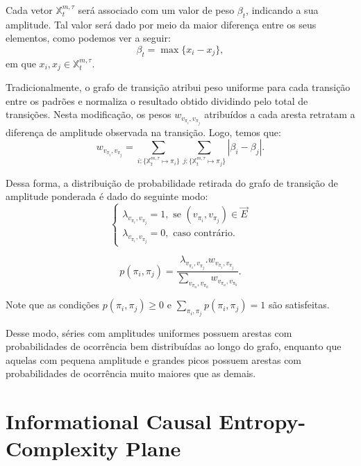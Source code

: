 \documentclass[12pt]{article}
\begin{document}
Cada vetor $\mathbb{X}^{m, \tau}_t$ será associado com um valor de peso $\beta_t$, indicando a sua amplitude. 
Tal valor será dado por meio da maior diferença entre os seus elementos, como podemos ver a seguir:
\begin{equation}
    \beta_t = \max\{x_i - x_j\},
\end{equation}
em que $x_i, x_j \in \mathbb{X}^{m, \tau}_t$.

Tradicionalmente, o grafo de transição atribui peso uniforme para cada transição entre os padrões e normaliza o resultado obtido dividindo pelo total de transições.
Nesta modificação, os pesos $w_{v_{\pi_i}, v_{\pi_j}}$ atribuídos a cada aresta retratam a diferença de amplitude observada na transição.
Logo, temos que:
\begin{equation}
    w_{v_{\pi_i}, v_{\pi_j}} =  \sum_{i : \{\mathbb{X}^{m,\tau}_t \mapsto \pi_i\}} \sum_{j : \{\mathbb{X}^{m,\tau}_t \mapsto \pi_j\}} |\beta_i - \beta_j| .
\end{equation}

Dessa forma, a distribuição de probabilidade retirada do grafo de transição de amplitude ponderada é dado do seguinte modo:
\begin{equation}
    \left\{\begin{array}{l}
        \lambda_{v_{\pi_i}, v_{\pi_j}} = 1, \text{ se } (v_{\pi_i}, v_{\pi_j}) \in \vec{E} \\
        \lambda_{v_{\pi_i}, v_{\pi_j}} = 0, \text{ caso contrário}.
        \end{array}\right.
\end{equation}

\begin{equation}
    p(\pi_i, \pi_j) = \frac{\lambda_{v_{\pi_i}, v_{\pi_j}} . w_{v_{\pi_i}, v_{\pi_j}}}{\sum_{v_{\pi_a}, v_{\pi_b}} w_{v_{\pi_a}, v_{\pi_b}}}.
\end{equation}

Note que as condições $p(\pi_i, \pi_j) \ge 0$ e $\sum_{\pi_i, \pi_j} p(\pi_i, \pi_j) = 1$ são  satisfeitas.

Desse modo, séries com amplitudes uniformes possuem arestas com probabilidades de ocorrência bem distribuídas ao longo do grafo, enquanto que aquelas com pequena amplitude e grandes picos possuem arestas com probabilidades de ocorrência muito maiores que as demais.

\section{Informational Causal Entropy-Complexity Plane}\label{HC}
\end{document}
